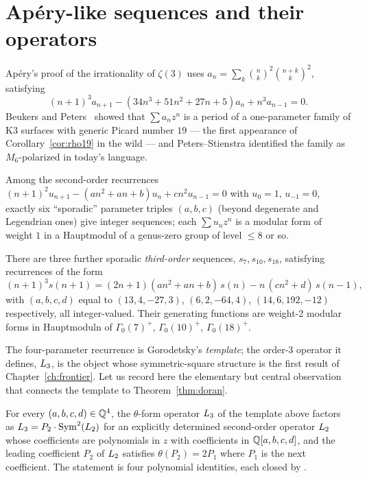 \section{Ap\'ery-like sequences and their operators}

\begin{example}
Ap\'ery's proof of the irrationality of $\zeta(3)$ uses
$a_n=\sum_k\binom nk^2\binom{n+k}k^2$, satisfying
\[
  (n+1)^3a_{n+1}-(34n^3+51n^2+27n+5)a_n+n^3a_{n-1}=0 .
\]
Beukers and Peters~\cite{BeukersPeters1984} showed that $\sum a_nz^n$ is a
period of a one-parameter family of K3 surfaces with generic Picard number
$19$ --- the first appearance of Corollary~\ref{cor:rho19} in the wild ---
and Peters--Stienstra identified the family as $M_6$-polarized in today's
language.
\end{example}

\begin{theorem}
Among the second-order recurrences $(n+1)^2u_{n+1}-(an^2+an+b)u_n+cn^2u_{n-1}=0$
with $u_0=1$, $u_{-1}=0$, exactly six ``sporadic'' parameter triples
$(a,b,c)$ (beyond degenerate and Legendrian ones) give integer sequences; each
$\sum u_nz^n$ is a modular form of weight $1$ in a Hauptmodul of a genus-zero
group of level $\le 8$ or so.
\end{theorem}

\begin{theorem}\label{thm:cooper}
There are three further sporadic \emph{third-order} sequences, $s_7,s_{10},s_{18}$,
satisfying recurrences of the form
\[
  (n+1)^3s(n+1) = (2n+1)(an^2+an+b)\,s(n)-n\,(cn^2+d)\,s(n-1),
\]
with $(a,b,c,d)$ equal to $(13,4,-27,3)$, $(6,2,-64,4)$, $(14,6,192,-12)$
respectively, all integer-valued. Their generating functions are weight-2
modular forms in Hauptmoduln of $\Gamma_0(7)^+$, $\Gamma_0(10)^+$, $\Gamma_0(18)^+$.
\end{theorem}

The four-parameter recurrence is Gorodetsky's \emph{template}; the order-3
operator it defines, $L_3$, is the object whose symmetric-square structure
is the first result of Chapter~\ref{ch:frontier}. Let us record here the
elementary but central observation that connects the template to
Theorem~\ref{thm:doran}.

\begin{proposition}\label{prop:template}
For every $(a,b,c,d)\in\mathbb{Q}^4$, the $\theta$-form operator $L_3$ of the
template above factors as $L_3=P_2\cdot\operatorname{Sym}^2(L_2)$ for an explicitly
determined second-order operator $L_2$ whose coefficients are polynomials in
$z$ with coefficients in $\mathbb{Q}[a,b,c,d]$, and the leading coefficient $P_2$ of
$L_2$ satisfies $\theta(P_2)=2P_1$ where $P_1$ is the next coefficient. The
statement is four polynomial identities, each closed by .
\end{proposition}

